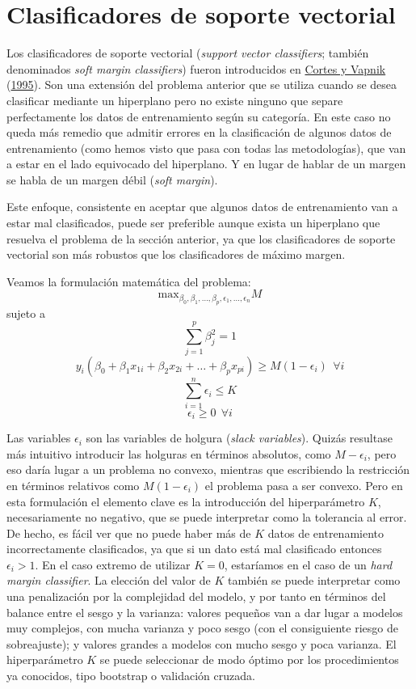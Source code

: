 \documentclass[
  spanish,
]{book}
\theoremstyle{break}
\theoremstyle{definition}
\theoremstyle{definition}
\theoremstyle{definition}
\theoremstyle{definition}
\theoremstyle{remark}
\begin{document}
\hypertarget{clasificadores-de-soporte-vectorial}{%
\section{Clasificadores de soporte vectorial}\label{clasificadores-de-soporte-vectorial}}

Los clasificadores de soporte vectorial (\emph{support vector classifiers}; también denominados \emph{soft margin classifiers}) fueron introducidos en \protect\hyperlink{ref-cortes1995support}{Cortes y Vapnik} (\protect\hyperlink{ref-cortes1995support}{1995}). Son una extensión del problema anterior que se utiliza cuando se desea clasificar mediante un hiperplano pero no existe ninguno que separe perfectamente los datos de entrenamiento según su categoría. En este caso no queda más remedio que admitir errores en la clasificación de algunos datos de entrenamiento (como hemos visto que pasa con todas las metodologías), que van a estar en el lado equivocado del hiperplano. Y en lugar de hablar de un margen se habla de un margen débil (\emph{soft margin}).

Este enfoque, consistente en aceptar que algunos datos de entrenamiento van a estar mal clasificados, puede ser preferible aunque exista un hiperplano que resuelva el problema de la sección anterior, ya que los clasificadores de soporte vectorial son más robustos que los clasificadores de máximo margen.

Veamos la formulación matemática del problema:
\[\mbox{max}_{\beta_0, \beta_1,\ldots, \beta_p, \epsilon_1,\ldots, \epsilon_n} M\]
sujeto a
\[\sum_{j=1}^p \beta_j^2 = 1\]
\[ y_i(\beta_0 + \beta_1 x_{1i} + \beta_2 x_{2i} + \ldots + \beta_p x_{pi}) \ge M(1 - \epsilon_i) \ \ \forall i\]
\[\sum_{i=1}^n \epsilon_i \le K\]
\[\epsilon_i \ge 0 \ \ \forall i\]

Las variables \(\epsilon_i\) son las variables de holgura (\emph{slack variables}). Quizás resultase más intuitivo introducir las holguras en términos absolutos, como \(M -\epsilon_i\), pero eso daría lugar a un problema no convexo, mientras que escribiendo la restricción en términos relativos como \(M(1 - \epsilon_i)\) el problema pasa a ser convexo. Pero en esta formulación el elemento clave es la introducción del hiperparámetro \(K\), necesariamente no negativo, que se puede interpretar como la tolerancia al error. De hecho, es fácil ver que no puede haber más de \(K\) datos de entrenamiento incorrectamente clasificados, ya que si un dato está mal clasificado entonces \(\epsilon_i > 1\). En el caso extremo de utilizar \(K = 0\), estaríamos en el caso de un \emph{hard margin classifier}. La elección del valor de \(K\) también se puede interpretar como una penalización por la complejidad del modelo, y por tanto en términos del balance entre el sesgo y la varianza: valores pequeños van a dar lugar a modelos muy complejos, con mucha varianza y poco sesgo (con el consiguiente riesgo de sobreajuste); y valores grandes a modelos con mucho sesgo y poca varianza. El hiperparámetro \(K\) se puede seleccionar de modo óptimo por los procedimientos ya conocidos, tipo bootstrap o validación cruzada.
\end{document}
